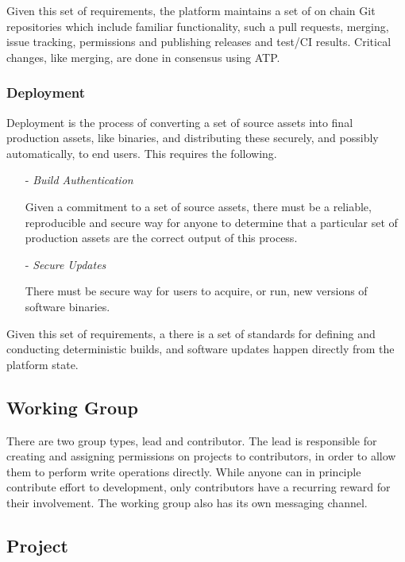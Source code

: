 \documentclass{article}
\begin{document}
Given this set of requirements, the platform maintains a set of on chain Git repositories which include familiar functionality, such a pull requests, merging, issue tracking, permissions and publishing releases and test/CI results. Critical changes, like merging, are done in consensus using ATP.

\subsubsection{Deployment}

Deployment is the process of converting a set of source assets into final production assets, like binaries, and distributing these securely, and possibly automatically, to end users. This requires the following.

\begin{enumerate}

    \item[-] \textit{Build Authentication}

    Given a commitment to a set of source assets, there must be a reliable, reproducible and secure way for anyone to determine that a particular set of production assets are the correct output of this process.

    \item[-] \textit{Secure Updates}

    There must be secure way for users to acquire, or run, new versions of software binaries.

\end{enumerate}

Given this set of requirements, a there is a set of standards for defining and conducting deterministic builds, and software updates happen directly from the platform state.

\subsection{Working Group}

There are two group types, lead and contributor. The lead is responsible for creating and assigning permissions on projects to contributors, in order to allow them to perform write operations directly. While anyone can in principle contribute effort to development, only contributors have a recurring reward for their involvement. The working group also has its own messaging channel.

\subsection{Project}
\end{document}
